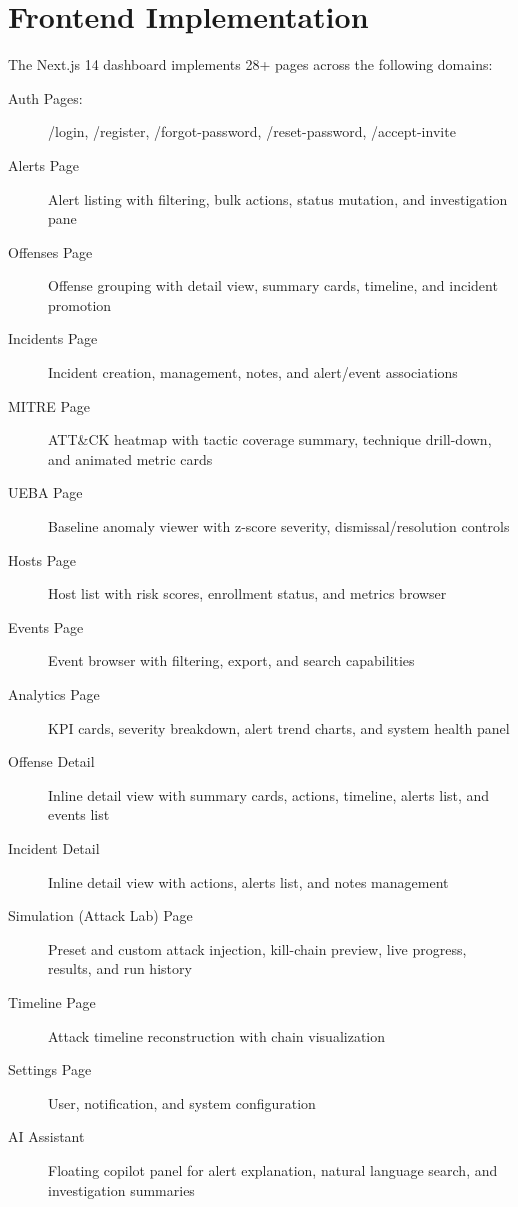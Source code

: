 \section{Frontend Implementation}

The Next.js 14 dashboard implements 28+ pages across the following domains:

\begin{description}
    \item[Auth Pages:] /login, /register, /forgot-password, /reset-password, /accept-invite
    \item[Alerts Page] Alert listing with filtering, bulk actions, status mutation, and investigation pane
    \item[Offenses Page] Offense grouping with detail view, summary cards, timeline, and incident promotion
    \item[Incidents Page] Incident creation, management, notes, and alert/event associations
    \item[MITRE Page] ATT\&CK heatmap with tactic coverage summary, technique drill-down, and animated metric cards
    \item[UEBA Page] Baseline anomaly viewer with z-score severity, dismissal/resolution controls
    \item[Hosts Page] Host list with risk scores, enrollment status, and metrics browser
    \item[Events Page] Event browser with filtering, export, and search capabilities
    \item[Analytics Page] KPI cards, severity breakdown, alert trend charts, and system health panel
    \item[Offense Detail] Inline detail view with summary cards, actions, timeline, alerts list, and events list
    \item[Incident Detail] Inline detail view with actions, alerts list, and notes management
    \item[Simulation (Attack Lab) Page] Preset and custom attack injection, kill-chain preview, live progress, results, and run history
    \item[Timeline Page] Attack timeline reconstruction with chain visualization
    \item[Settings Page] User, notification, and system configuration
    \item[AI Assistant] Floating copilot panel for alert explanation, natural language search, and investigation summaries
\end{description}

